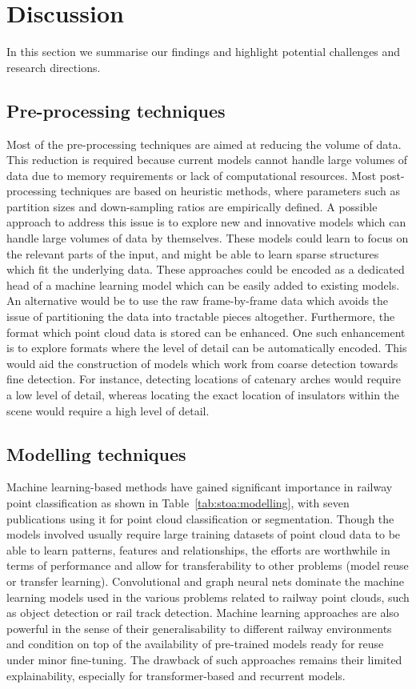 \section{Discussion}\label{sec:stoa:discussion}
In this section we summarise our findings and highlight potential challenges and research directions. 

\subsection{Pre-processing techniques}
Most of the pre-processing techniques are aimed at reducing the volume of data. This reduction is required because current models cannot handle large volumes of data due to memory requirements or lack of computational resources. Most post-processing techniques are based on heuristic methods, where parameters such as partition sizes and down-sampling ratios are empirically defined.
A possible approach to address this issue is to explore new and innovative models which can handle large volumes of data by themselves. These models could learn to focus on the relevant parts of the input, and might be able to learn sparse structures which fit the underlying data. These approaches could be encoded as a dedicated head of a machine learning model which can be easily added to existing models.
An alternative would be to use the raw frame-by-frame data which avoids the issue of partitioning the data into tractable pieces altogether.
Furthermore, the format which point cloud data is stored can be enhanced. One such enhancement is to explore formats where the level of detail can be automatically encoded. This would aid the construction of models which work from coarse detection towards fine detection. For instance, detecting locations of catenary arches would require a low level of detail, whereas locating the exact location of insulators within the scene would require a high level of detail.

\subsection{Modelling techniques}
Machine learning-based methods have gained significant importance in railway point classification as shown in Table~\ref{tab:stoa:modelling}, with seven publications using it for point cloud classification or segmentation. Though the models involved usually require large training datasets of point cloud data to be able to learn patterns, features and relationships, the efforts are worthwhile in terms of performance and allow for transferability to other problems (model reuse or transfer learning). Convolutional and graph neural nets dominate the machine learning models used in the various problems related to railway point clouds, such as object detection or rail track detection. Machine learning approaches are also powerful in the sense of their generalisability to different railway environments and condition on top of the availability of pre-trained models ready for reuse under minor fine-tuning. The drawback of such approaches remains their limited explainability, especially for transformer-based and recurrent models.

